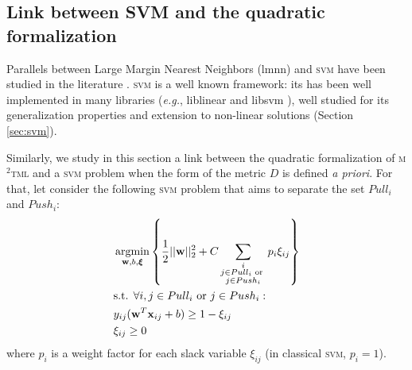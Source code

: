 \subsection{Link between SVM and the quadratic formalization}

Parallels between Large Margin Nearest Neighbors ({\sc lmnn}) and \textsc{svm} have been studied in the literature \cite{Do2012}. \textsc{svm} is a well known framework: its has been well implemented in many libraries (\textit{e.g.}, {\sc liblinear} \cite{Fan2008} and {\sc libsvm} \cite{Hsu2008}), well studied for its generalization properties and extension to non-linear solutions (Section \ref{sec:svm}). 

\noindent Similarly, we study in this section a link between the quadratic formalization of \textsc{m$^2$tml} and a \textsc{svm} problem when the form of the metric $D$ is defined \textit{a priori}. For that, let consider the following \textsc{svm} problem that aims to separate the set $Pull_i$ and $Push_i$:
\begin{equation}
\begin{aligned}
&\displaystyle \argmin_{\textbf{w},b,\boldsymbol{\xi}} 
\left\lbrace \frac{1}{2}||\textbf{w}||_2^2
+ C \sum\limits_{\substack{i \\j \in Pull_i \text{  or  } \\ j \in Push_i}}p_i\xi_{ij} \right\rbrace \\
& \text{s.t.  }  \forall i,j \in Pull_i \text{  or  } j \in Push_i: \\
& y_{ij}(\textbf{w}^T\textbf{x}_{ij}+b) \geq 1-\xi_{ij} \\
& \xi_{ij} \geq 0
\end{aligned}
\label{eq:SVMSofMarginProblem0}
\end{equation}
\noindent where $p_i$ is a weight factor for each slack variable $\xi_{ij}$ (in classical \textsc{svm}, $p_i=1$). 

